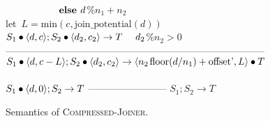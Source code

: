 \begin{figure}[t]
$\mbox{~~~~}\hspace{37.7pt}\mbox{\bf ~else~} d$\%$n_1 + n_2$\\
let~$L=\mbox{min}(c,\mbox{join\_potential}(d))$\\
$S_1 \bullet \langle d, c\rangle; S_2 \bullet \langle d_2, c_2\rangle \rightarrow T~~~~d_2$\%$n_2 > 0$\vspace{-3pt}\skiptopa
--------------------------------------------------------------------------------\skipbot
$S_1 \bullet \langle d, c-L\rangle; S_2 \bullet \langle d_2, c_2\rangle \rightarrow \langle n_2{\hspace{1.3pt}}\mbox{floor}(d/n_1) + \mbox{offset'}, L\rangle \bullet T$
\\ ~ \\
$S_1 \bullet \langle d, 0\rangle; S_2 \rightarrow T$\skiptopb
------------------------\skipbot
$S_1; S_2 \rightarrow T$
\caption{Semantics of \textsc{Compressed-Joiner}.
\protect\label{fig:compressed-joiner}}
\end{figure}


